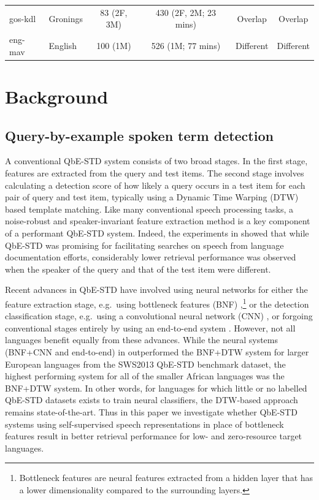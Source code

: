 \documentclass{article}
\begin{document}
\begin{table}[!t]
\begin{tabular}{llcccc}
    \cmidrule(lr){1-6}
    gos-kdl  & Gronings         & 83 (2F, 3M)           & 430 (2F, 2M; 23 mins)   & \cellcolor{gray!20}Overlap & \cellcolor{gray!20}Overlap  \\
    eng-mav  & English          & 100 (1M)     & 526 (1M; 77 mins)   & \cellcolor{gray!60}Different & \cellcolor{gray!60}Different  \\
    \bottomrule
  \end{tabular}
  
\end{table}

\section{Background}

\subsection{Query-by-example spoken term detection}

A conventional QbE-STD system consists of two broad stages.
In the first stage, features are extracted from the query and test items.
The second stage involves calculating a detection score of how likely a query occurs in a test item for each pair of query and test item, typically using a Dynamic Time Warping (DTW) based template matching.
Like many conventional speech processing tasks, a noise-robust and speaker-invariant feature extraction method is a key component of a performant QbE-STD system.
Indeed, the experiments in \cite{leferrandEnablingInteractiveTranscription2020} showed that while QbE-STD was promising for facilitating searches on speech from language documentation efforts, considerably lower retrieval performance was observed when the speaker of the query and that of the test item were different.

Recent advances in QbE-STD have involved using neural networks for either the feature extraction stage, e.g.~using bottleneck features (BNF) \cite{menonFeatureExplorationAlmost2018},\footnote{Bottleneck features are neural features extracted from a hidden layer that has a lower dimensionality compared to the surrounding layers.} or the detection classification stage, e.g.~using a convolutional neural network (CNN) \cite{ramCNNBasedQuery2018}, or forgoing conventional stages entirely by using an end-to-end system \cite{ramNeuralNetworkBased2020}.
However, not all languages benefit equally from these advances.
While the neural systems (BNF+CNN and end-to-end) in \cite{ramNeuralNetworkBased2020} outperformed the BNF+DTW system for larger European languages from the SWS2013 QbE-STD benchmark dataset, the highest performing system for all of the smaller African languages was the BNF+DTW system. 
In other words, for languages for which little or no labelled QbE-STD datasets exists to train neural classifiers, the DTW-based approach remains state-of-the-art.
Thus in this paper we investigate whether QbE-STD systems using self-supervised speech representations in place of bottleneck features result in better retrieval performance for low- and zero-resource target languages.
\end{document}
